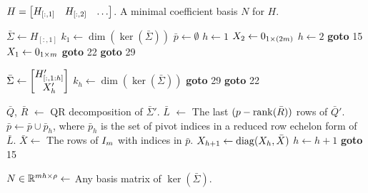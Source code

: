 \begin{algorithm}[h!]
  \caption{Computation of a minimal coefficients basis.}
  \label{alg:ddall_mincoeffbasis}
  \begin{algorithmic}[1]
    \Require $H = \begin{bmatrix}H_{[:,1]} & H_{[:,2]} & \ldots\end{bmatrix}$.
    \Ensure A minimal coefficient basis $N$ for $H$.

    \State $\bar{\Sigma} \gets H_{[:,1]}$
    \State $k_1 \gets \dim(\ker(\bar{\Sigma}))$
    \State $\bar{p} \gets \emptyset$
    \State $h \gets 1$
        \State $X_2 \gets 0_{1\times(2m)}$
        \State $h \gets 2$
        \State \textbf{goto} 15
        \State $X_1 \gets 0_{1\times m}$
        \State \textbf{goto} 22
        \State \textbf{goto} 29
    \EndIf

    \State $\bar{\Sigma}\gets\begin{bmatrix}H_{[:,1:h]}' \\ X_h'\end{bmatrix}$
    \State $k_h \gets \dim(\ker(\bar{\Sigma}))$
        \State \textbf{goto} 29
    \Else
        \State \textbf{goto} 22
    \EndIf

    \State $\bar{Q}$, $\bar{R}$ $\gets$ QR decomposition of $\bar{\Sigma}'$.
    \Statex {}
    \State $\bar{L}$ $\gets$ The last $(p-\operatorname{rank}(\bar{R}))$ rows of $\bar{Q}'$.
    \State $\bar{p}\gets\bar{p}\cup\bar{p}_h$, where $\bar{p}_h$ is the set of pivot indices in a reduced row echelon form of $\bar{L}$.
    \State $\bar{X}\gets$ The rows of $I_m$ with indices in $\bar{p}$.
    \State $X_{h+1} \gets \operatorname{diag}(X_h, \bar{X})$
    \State $h \gets h+1$
    \State \textbf{goto} 15

    \State $N\in\mathbb{R}^{m h\times\rho}\gets$ Any basis matrix of $\ker(\bar{\Sigma})$.
  \end{algorithmic}
\end{algorithm}

